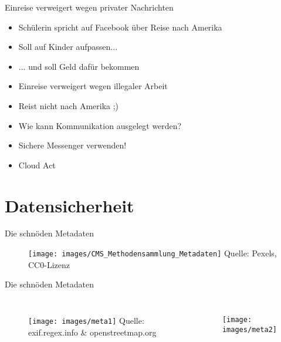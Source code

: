 \documentclass[10pt]{beamer}
\begin{document}
\begin{frame}[fragile]{Einreise verweigert wegen privater Nachrichten}
\begin{itemize}
    \item Schülerin spricht auf Facebook über Reise nach Amerika
    \item Soll auf Kinder aufpassen...
    \item ... und soll Geld dafür bekommen
    \item Einreise verweigert wegen illegaler Arbeit
    \item \alert{Reist nicht nach Amerika ;)}
    \item \alert{Wie kann Kommunikation ausgelegt werden?}
    \item \alert{Sichere Messenger verwenden!}
    \item \alert{Cloud Act}
  \end{itemize}
\end{frame}


\section{Datensicherheit}

%
%
\begin{frame}[fragile]{Die schnöden Metadaten}
	\begin{figure}
		\texttt{[image: images/CMS\_Methodensammlung\_Metadaten]}
			\tiny Quelle: Pexels, CC0-Lizenz
	\end{figure}
\end{frame}

\begin{frame}[fragile]{Die schnöden Metadaten}
\begin{columns}[T,c,onlytextwidth]
	\begin{figure}
		\texttt{[image: images/meta1]}
		\tiny Quelle: exif.regex.info \& openstreetmap.org
	\end{figure}
	\begin{figure}
		\texttt{[image: images/meta2]}
	\end{figure}
\end{columns}

\end{frame}
\end{document}
